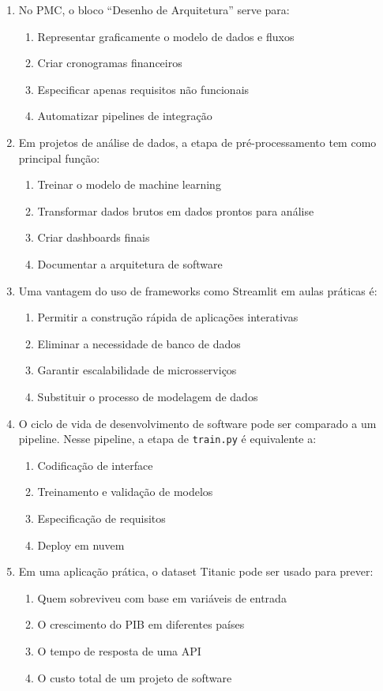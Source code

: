 \documentclass[12pt,a4paper]{article}
\begin{document}
\begin{enumerate}
\item No PMC, o bloco “Desenho de Arquitetura” serve para:
\begin{enumerate}[label=\alph*)]
\item Representar graficamente o modelo de dados e fluxos
\item Criar cronogramas financeiros
\item Especificar apenas requisitos não funcionais
\item Automatizar pipelines de integração
\end{enumerate}

\item Em projetos de análise de dados, a etapa de pré-processamento tem como principal função:
\begin{enumerate}[label=\alph*)]
\item Treinar o modelo de machine learning
\item Transformar dados brutos em dados prontos para análise
\item Criar dashboards finais
\item Documentar a arquitetura de software
\end{enumerate}

\item Uma vantagem do uso de frameworks como Streamlit em aulas práticas é:
\begin{enumerate}[label=\alph*)]
\item Permitir a construção rápida de aplicações interativas
\item Eliminar a necessidade de banco de dados
\item Garantir escalabilidade de microsserviços
\item Substituir o processo de modelagem de dados
\end{enumerate}

\item O ciclo de vida de desenvolvimento de software pode ser comparado a um pipeline. Nesse pipeline, a etapa de \texttt{train.py} é equivalente a:
\begin{enumerate}[label=\alph*)]
\item Codificação de interface
\item Treinamento e validação de modelos
\item Especificação de requisitos
\item Deploy em nuvem
\end{enumerate}

\item Em uma aplicação prática, o dataset Titanic pode ser usado para prever:
\begin{enumerate}[label=\alph*)]
\item Quem sobreviveu com base em variáveis de entrada
\item O crescimento do PIB em diferentes países
\item O tempo de resposta de uma API
\item O custo total de um projeto de software
\end{enumerate}


\end{enumerate}
\end{document}
